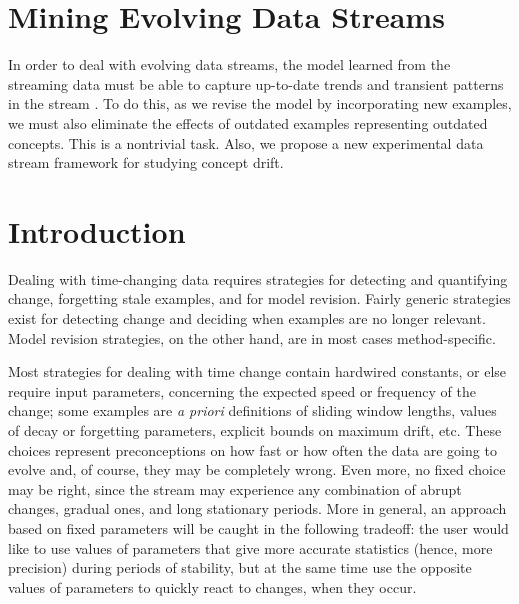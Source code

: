 

\BEGINOMIT
\section{Mining Evolving Data Streams}%

\label{ch:conceptdrift}

In order to deal with evolving data streams,
the model learned
from the streaming data must be able to capture up-to-date trends
and transient patterns in the stream \cite{tsymbal-problem,wang03mining}. To do this, as we revise the
model by incorporating new examples, we must also eliminate the
effects of outdated examples representing outdated concepts. This is a nontrivial
task. Also, we propose a new experimental data stream framework for
studying concept drift.

\section{Introduction}
 Dealing with time-changing data requires %
strategies for detecting and quantifying change, forgetting stale examples, 
and for model revision. Fairly generic strategies exist for detecting
change and deciding when examples are no longer relevant. Model revision
strategies, on the other hand, are in most cases method-specific.

Most strategies for dealing with time change contain hardwired constants, 
or else require input parameters, concerning the expected speed or frequency 
of the change; some examples are {\em a priori} definitions of sliding window
lengths, values of decay or forgetting parameters, explicit bounds on maximum drift, etc. 
These choices represent preconceptions 
on how fast or how often the data are going to evolve and, of course, they 
may be completely wrong. Even more, no fixed 
choice may be right, since the stream may experience any combination 
of abrupt changes, gradual ones, and long stationary periods. 
More in general, an approach based on fixed parameters will be caught in the following tradeoff: 
the user would like to use values of parameters that give more accurate statistics 
(hence, more precision) during periods of stability, but at the same time use the opposite values of
 parameters to %
quickly react to changes, when they occur. 

